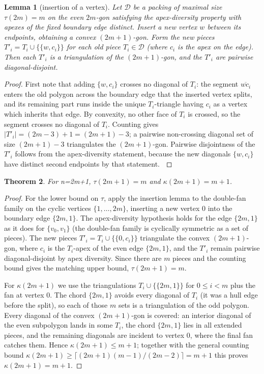 \documentclass[11pt,a4paper]{article}
\newtheorem{theorem}{Theorem}
\newtheorem{lemma}[theorem]{Lemma}
\begin{document}
\begin{lemma}[insertion of a vertex]
Let $\mathcal D$ be a packing of maximal size $\tau(2m)=m$ on the even $2m$-gon
satisfying the apex-diversity property with apexes of the fixed boundary edge
\emph{distinct}. Insert a new vertex $w$ between its endpoints, obtaining a
convex $(2m+1)$-gon. Form the new pieces
$T'_i = T_i \cup \{\{w, c_i\}\}$ for each old piece $T_i \in \mathcal D$
(where $c_i$ is the apex on the edge). Then each $T'_i$ is a triangulation of
the $(2m+1)$-gon, and the $T'_i$ are pairwise diagonal-disjoint.
\end{lemma}

\begin{proof}
First note that adding $\{w,c_i\}$ crosses no diagonal of $T_i$: the segment
$\overline{wc_i}$ enters the old polygon across the boundary edge that the
inserted vertex splits, and its remaining part runs inside the unique
$T_i$-triangle having $c_i$ as a vertex which inherits that edge. By convexity,
no other face of $T_i$ is crossed, so the segment crosses no diagonal of
$T_i$. Counting gives $|T'_i| = (2m-3)+1 = (2m+1)-3$; a pairwise
non-crossing diagonal set of size $(2m+1)-3$ triangulates the $(2m+1)$-gon.
Pairwise disjointness of the $T'_i$ follows from the apex-diversity statement,
because the new diagonals $\{w,c_i\}$ have distinct second endpoints by that
statement. $\qedhere$
\end{proof}

\begin{theorem}
For n=2m+1, $\tau(2m+1)=m$ and $\kappa(2m+1)=m+1$.
\end{theorem}

\begin{proof}
For the lower bound on $\tau$, apply the insertion lemma to the double-fan
family on the cyclic vertices $\{1,\dots,2m\}$, inserting a new vertex $0$ into
the boundary edge $\{2m,1\}$. The apex-diversity hypothesis holds for the edge
$\{2m,1\}$ as it does for $\{v_0,v_1\}$ (the double-fan family is cyclically
symmetric as a set of pieces). The new pieces
$T'_i = T_i \cup \{\{0,c_i\}\}$ triangulate the convex $(2m+1)$-gon, where
$c_i$ is the $T_i$-apex of the even edge $\{2m,1\}$, and the $T'_i$ remain
pairwise diagonal-disjoint by apex diversity. Since there are $m$ pieces and the
counting bound gives the matching upper bound, $\tau(2m+1)=m$.

For $\kappa(2m+1)$ we use the triangulations
$T_i \cup \{\{2m,1\}\}$ for $0 \le i < m$ plus the fan at vertex $0$. The
chord $\{2m,1\}$ avoids every diagonal of $T_i$ (it was a hull edge before the
split), so each of those $m$ sets is a triangulation of the odd polygon. Every
diagonal of the convex $(2m+1)$-gon is covered: an interior diagonal of the even
subpolygon lands in some $T_i$, the chord $\{2m,1\}$ lies in all extended
pieces, and the remaining diagonals are incident to vertex $0$, where the final
fan catches them. Hence $\kappa(2m+1)\le m+1$; together with the general
counting bound $\kappa(2m+1) \ge \lceil (2m+1)(m-1)/(2m-2)\rceil = m+1$ this
proves $\kappa(2m+1)=m+1$.\qedhere
\end{proof}
\end{document}
